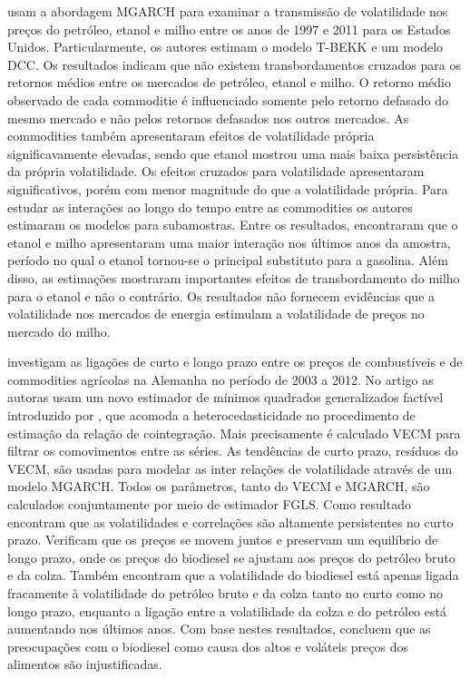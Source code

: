 	 usam a abordagem MGARCH para examinar a transmissão de volatilidade nos preços do petróleo, etanol e milho entre os anos de 1997 e 2011 para os Estados Unidos.  Particularmente, os autores estimam o modelo T-BEKK e um modelo DCC. Os resultados indicam que não existem transbordamentos cruzados para os retornos médios entre os   mercados de petróleo, etanol e milho. O retorno médio observado de cada commoditie é influenciado somente pelo retorno defasado do mesmo mercado e não pelos retornos defasados nos outros mercados. As commodities também apresentaram efeitos de volatilidade própria significavamente elevadas, sendo que etanol mostrou uma mais baixa persistência da própria volatilidade. Os efeitos cruzados para volatilidade apresentaram significativos, porém com menor magnitude do que a volatilidade própria. Para estudar as interações ao longo do tempo entre as commodities os autores estimaram os modelos para subamostras. Entre os resultados, encontraram  que o etanol e milho apresentaram uma maior interação nos últimos anos da amostra, período no qual o etanol tornou-se o principal substituto para a gasolina. Além disso, as estimações mostraram importantes efeitos de transbordamento do milho para o etanol e não o contrário.  Os resultados não fornecem evidências que a volatilidade nos mercados de energia estimulam a volatilidade de preços no mercado do milho. 
	
	 investigam as ligações de curto e longo prazo entre os preços de combustíveis e de commodities agrícolas na Alemanha no período de 2003 a 2012. No artigo as autoras usam um novo estimador de mínimos quadrados generalizados  factível  introduzido por , que acomoda a heterocedasticidade no procedimento de estimação da relação de cointegração. Mais precisamente é calculado VECM para filtrar os comovimentos entre as séries. As tendências de curto prazo, resíduos do VECM, são usadas para modelar as inter relações de volatilidade através de um modelo MGARCH. Todos os parâmetros, tanto do VECM e MGARCH, são calculados conjuntamente por meio de estimador FGLS. Como resultado encontram que as volatilidades e correlações são altamente persistentes no curto prazo. Verificam que os preços se movem juntos e preservam um equilíbrio de longo prazo,  onde os preços do biodiesel se ajustam aos preços do petróleo bruto e da colza. Também encontram que a volatilidade do biodiesel está apenas ligada fracamente à volatilidade do petróleo bruto e da colza tanto no curto como no longo prazo, enquanto a ligação entre a volatilidade da colza e do petróleo  está aumentando nos últimos anos. Com base nestes resultados, concluem que as preocupações com o biodiesel como causa dos altos e voláteis  preços dos alimentos são  injustificadas.
	
